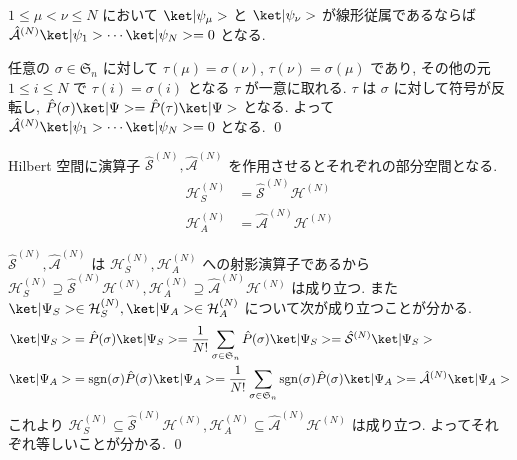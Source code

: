 \documentclass[uplatex,dvipdfmx,a4paper,11pt]{jlreq}
\makeatletter
\DeclareMathOperator{\sgn}{sgn}
\newcommand{\HH}{\mathcal{H}}
\renewcommand{\SS}{\mathfrak{S}}
\renewcommand{\S}{\mathcal{S}}
\newcommand{\A}{\mathcal{A}}
\numberwithin{equation}{section}
\theoremstyle{definition}
\renewenvironment{proof}[1][\proofname]{\par
  \normalfont
  \topsep6\p@\@plus6\p@ \trivlist
  \item[\hskip\labelsep{\bfseries #1}\@addpunct{\bfseries}]\ignorespaces\quad\par
}{%
  \qed\endtrivlist\@endpefalse
}
\renewcommand\proofname{証明}
\makeatother
\begin{document}
\begin{theorem}[Q21-15(i)(ii)]
  $1\leq\mu<\nu\leq N$ において $\ket|\psi_\mu>$ と $\ket|\psi_\nu>$ が線形従属であるならば $\hat{\A}^{(N)}\ket|\psi_1>\cdots\ket|\psi_N> = 0$ となる.
\end{theorem}
\begin{proof}
  任意の $\sigma\in\SS_n$ に対して $\tau(\mu) = \sigma(\nu)$, $\tau(\nu) = \sigma(\mu)$ であり, その他の元 $1\leq i\leq N$ で $\tau(i) = \sigma(i)$ となる $\tau$ が一意に取れる. $\tau$ は $\sigma$ に対して符号が反転し, $\hat{P}(\sigma)\ket|\Psi> = \hat{P}(\tau)\ket|\Psi>$ となる. よって $\hat{\A}^{(N)}\ket|\psi_1>\cdots\ket|\psi_N> = 0$ となる.
\end{proof}

\begin{lemma}
  Hilbert 空間に演算子 $\hat{\S}^{(N)}, \hat{\A}^{(N)}$ を作用させるとそれぞれの部分空間となる.
  \begin{align}
    \HH_S^{(N)} & = \hat{\S}^{(N)}\HH^{(N)} \\
    \HH_A^{(N)} & = \hat{\A}^{(N)}\HH^{(N)}
  \end{align}
  \label{hilbert corespondence}
\end{lemma}
\begin{proof}
  $\hat{\S}^{(N)}, \hat{\A}^{(N)}$ は $\HH_S^{(N)}, \HH_A^{(N)}$ への射影演算子であるから $\HH_S^{(N)} \supseteq \hat{\S}^{(N)}\HH^{(N)}, \HH_A^{(N)} \supseteq \hat{\A}^{(N)}\HH^{(N)}$ は成り立つ.
  また $\ket|\Psi_S>\in\HH_S^{(N)}, \ket|\Psi_A>\in\HH_A^{(N)}$ について次が成り立つことが分かる.
  \begin{align}
    \ket|\Psi_S> & = \hat{P}(\sigma)\ket|\Psi_S> = \frac{1}{N!}\sum_{\sigma\in\SS_n}\hat{P}(\sigma)\ket|\Psi_S> = \hat{\S}^{(N)}\ket|\Psi_S>                         \\
    \ket|\Psi_A> & = \sgn(\sigma)\hat{P}(\sigma)\ket|\Psi_A> = \frac{1}{N!}\sum_{\sigma\in\SS_n}\sgn(\sigma)\hat{P}(\sigma)\ket|\Psi_A> = \hat{\A}^{(N)}\ket|\Psi_A>
  \end{align}
  これより $\HH_S^{(N)} \subseteq \hat{\S}^{(N)}\HH^{(N)}, \HH_A^{(N)} \subseteq \hat{\A}^{(N)}\HH^{(N)}$ は成り立つ. よってそれぞれ等しいことが分かる.
\end{proof}
\end{document}
